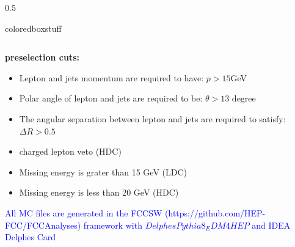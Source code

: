 \documentclass[xcolor=dvipsnames,8pt]{beamer}
\begin{document}
\begin{frame}
\begin{columns}
\begin{column}{0.5\textwidth}
\begin{beamercolorbox}[wd=1\textwidth,sep=1em]{coloredboxstuff}
{\begin{tabular}{c|c|c}
				\end{tabular}%
			}
		\end{beamercolorbox}
	\footnotesize
		{\bf  preselection cuts:}
		\begin{itemize}
			\item Lepton and jets momentum are  required to have: $p>15$GeV
			\item Polar angle of lepton and jets are required to be: $\theta>13$ degree
			\item The angular separation between lepton and jets are required to satisfy: $\Delta R>0.5$
			\item charged lepton veto (HDC)
			\item Missing energy  is grater than 15 GeV (LDC)
			\item Missing energy  is less than 20 GeV (HDC)
		\end{itemize}
	\textcolor{Blue}{
		\footnotesize
		All MC files are generated in the FCCSW (https://github.com/HEP-FCC/FCCAnalyses) framework with $DelphesPythia8_EDM4HEP$ and IDEA Delphes Card}
	\end{column}
\end{columns}
\vspace{0.5cm}

\end{frame}
\end{document}
